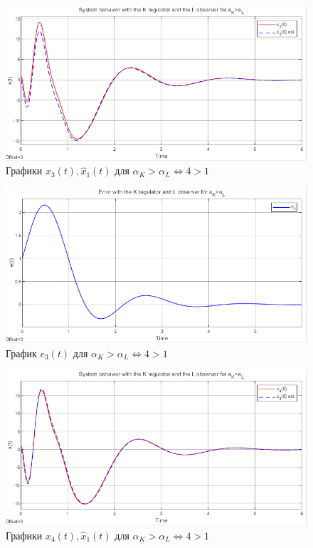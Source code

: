 \documentclass[a4paper, 12pt]{article}
\begin{document}
    \newpage
    \vspace*{20mm}
    \begin{figure}[H]
        \centering
        \includegraphics[scale=0.8]{2task_aKgaL_x3.png}
        \captionsetup{skip=0pt}
        \caption{Графики $x_3(t),\hat{x}_1(t)$ для $\alpha_K>\alpha_L\Leftrightarrow4>1$}
        \label{2task_aKgaL_x3}
    \end{figure}
    \begin{figure}[H]
        \centering
        \includegraphics[scale=0.8]{2task_aKgaL_e3.png}
        \captionsetup{skip=0pt}
        \caption{График $e_3(t)$ для $\alpha_K>\alpha_L\Leftrightarrow4>1$}
        \label{2task_aKgaL_e3}
    \end{figure}
    \newpage
    \vspace*{20mm}
    \begin{figure}[H]
        \centering
        \includegraphics[scale=0.8]{2task_aKgaL_x4.png}
        \captionsetup{skip=0pt}
        \caption{Графики $x_4(t),\hat{x}_1(t)$ для $\alpha_K>\alpha_L\Leftrightarrow4>1$}
        \label{2task_aKgaL_x4}
    \end{figure}
\end{document}
